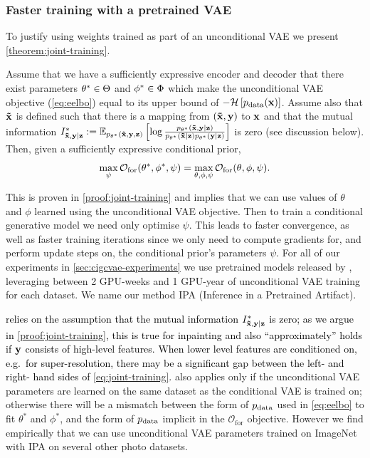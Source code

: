 \subsubsection{Faster training with a pretrained VAE}
To justify using weights trained as part of an unconditional VAE we present
\cref{theorem:joint-training}.
%
\begin{theorem} \label{theorem:joint-training} Assume that we have a
  sufficiently expressive encoder and decoder that there exist parameters
  ${\theta}^*\in\Theta$ and ${\phi}^*\in\Phi$ which make the
  unconditional VAE objective (\cref{eq:eelbo}) equal to its upper bound of
  $-\mathcal{H}\left[ p_{\rm{data}}({\mathbf{x}}) \right]$. Assume also that $\mathbf{\tilde{x}}{}$ is
  defined such that there is a mapping from $(\mathbf{\tilde{x}}{},{\mathbf{y}})$ to ${\mathbf{x}}$ and
  that the mutual information ${I^*_{\mathbf{\tilde{x}}{},\mathbf{y}{}|\mathbf{z}{}}{} := \mathbb{E}_{p_{\theta^*}(\mathbf{\tilde{x}}{}, {\mathbf{y}},
      {\mathbf{z}})} \left[ \log \frac{p_{\theta^*}(\mathbf{\tilde{x}}{},{\mathbf{y}}|{\mathbf{z}})
      }{ p_{\theta^*}(\mathbf{\tilde{x}}{}|{\mathbf{z}})p_{\theta^*}({\mathbf{y}}|{\mathbf{z}}) }
    \right]}$ is zero (see discussion below). Then, given a sufficiently expressive
  conditional prior,
  \begin{equation} \label{eq:joint-training}
    \max_{\psi} \mathcal{O}_\mathrm{for}({\theta}^*, {\phi}^*, \psi) = \max_{\theta, \phi, \psi} \mathcal{O}_\mathrm{for}(\theta, \phi, \psi).
  \end{equation}
\end{theorem}
This is proven in \cref{proof:joint-training} and implies that we can use values
of $\theta$ and $\phi$ learned using the unconditional VAE objective. Then to
train a conditional generative model we need only optimise $\psi$. This
leads to faster convergence, as well as faster training iterations since we only
need to compute gradients for, and perform update steps on, the conditional prior's parameters $\psi$. For all of our experiments in
\cref{sec:cigcvae-experiments} we use pretrained models released by
\citet{child2020very}, leveraging between 2 GPU-weeks and 1 GPU-year of
unconditional VAE training for each dataset. We name our method IPA (Inference
in a Pretrained Artifact).

\textcolor{black}{ relies on the assumption that
  the mutual information $I^*_{\mathbf{\tilde{x}}{},\mathbf{y}{}|\mathbf{z}{}}$ is zero; as we argue in
  \cref{proof:joint-training}, this is true for inpainting and also
  ``approximately'' holds if ${\mathbf{y}}$ consists of high-level features. When
  lower level features are conditioned on, e.g.~for super-resolution, there may
  be a significant gap between the left- and right- hand sides of
  \cref{eq:joint-training}. }  also applies only if
the unconditional VAE parameters are learned on the same dataset as the
conditional VAE is trained on; otherwise there will be a mismatch between the
form of $p_{\rm{data}}$ used in \cref{eq:eelbo} to fit $\theta^*$ and $\phi^*$, and
the form of $p_{\rm{data}}$ implicit in the $\mathcal{O}_\mathrm{for}$ objective.
However we find empirically that we can use unconditional VAE parameters trained
on ImageNet~\citep{deng2009imagenet} with IPA on several other photo datasets.

